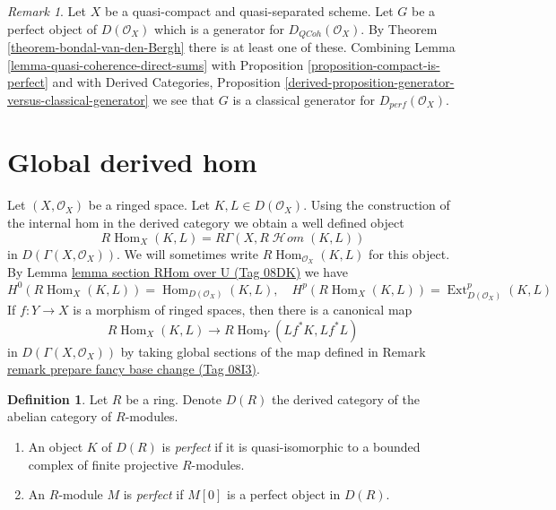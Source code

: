 \documentclass{amsart}
\theoremstyle{plain}
\theoremstyle{definition}
\newtheorem{definition}[subsection]{Definition}
\theoremstyle{remark}
\newtheorem{remark}[subsection]{Remark}
\numberwithin{equation}{subsection}
\def\Hom{\mathop{\mathrm{Hom}}\nolimits}
\def\Ext{\mathop{\mathrm{Ext}}\nolimits}
\def\SheafHom{\mathop{\mathcal{H}\!\mathit{om}}\nolimits}
\def\QCoh{\mathit{QCoh}}
\begin{document}
\begin{remark}
\label{remark-classical-generator}
Let $X$ be a quasi-compact and quasi-separated scheme. Let $G$ be a
perfect object of $D(\mathcal{O}_X)$ which is a generator for
$D_\QCoh(\mathcal{O}_X)$. By Theorem \ref{theorem-bondal-van-den-Bergh}
there is at least one of these. Combining
Lemma \ref{lemma-quasi-coherence-direct-sums} with
Proposition \ref{proposition-compact-is-perfect} and with
Derived Categories, Proposition
\ref{derived-proposition-generator-versus-classical-generator}
we see that $G$ is a classical generator for $D_{perf}(\mathcal{O}_X)$.
\end{remark}

\section{Global derived hom}
\label{cohomology-section-global-RHom}

\noindent
Let $(X, \mathcal{O}_X)$ be a ringed space. Let $K, L \in D(\mathcal{O}_X)$.
Using the construction of the internal hom in the derived category we
obtain a well defined object
$$
R\Hom_X(K, L) = R\Gamma(X, R\SheafHom(K, L))
$$
in $D(\Gamma(X, \mathcal{O}_X))$. We will sometimes write
$R\Hom_{\mathcal{O}_X}(K, L)$ for this object.
By Lemma \href{https://stacks.math.columbia.edu/tag/08DK}{lemma section RHom over U (Tag 08DK)}
we have
$$
H^0(R\Hom_X(K, L)) = \Hom_{D(\mathcal{O}_X)}(K, L),
\quad
H^p(R\Hom_X(K, L)) = \Ext_{D(\mathcal{O}_X)}^p(K, L)
$$
If $f : Y \to X$ is a morphism of ringed spaces, then there is
a canonical map
$$
R\Hom_X(K, L) \longrightarrow R\Hom_Y(Lf^*K, Lf^*L)
$$
in $D(\Gamma(X, \mathcal{O}_X))$ by taking global sections of the map
defined in Remark \href{https://stacks.math.columbia.edu/tag/08I3}{remark prepare fancy base change (Tag 08I3)}.










\begin{definition}
\label{more-algebra-definition-perfect}
Let $R$ be a ring. Denote $D(R)$ the derived category of the abelian
category of $R$-modules.
\begin{enumerate}
\item An object $K$ of $D(R)$ is {\it perfect} if it is quasi-isomorphic
to a bounded complex of finite projective $R$-modules.
\item An $R$-module $M$ is {\it perfect} if $M[0]$ is a perfect object
in $D(R)$.
\end{enumerate}
\end{definition}
\end{document}
